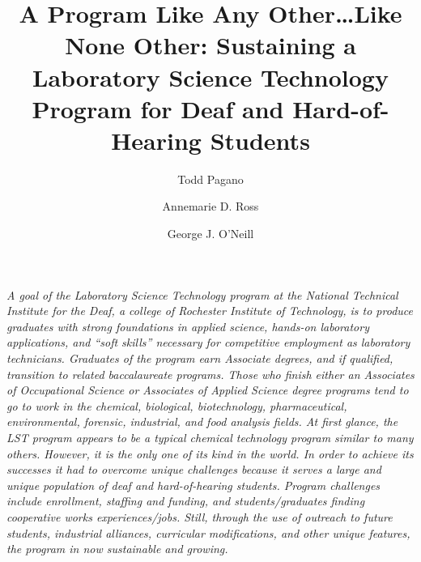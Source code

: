 \documentclass[11.5pt]{sig-alternate} %
\makeatletter
\let\oldabstract\abstract
\let\oldendabstract\endabstract
\renewenvironment{abstract} %
{\renewenvironment{quotation}%
               {\list{}{\addtolength{\leftmargin}{1em} %
                        \listparindent 1.5em%
                        \itemindent    \listparindent%
                        \rightmargin   \leftmargin%
                        \parsep        \z@ \@plus\p@}%
                \item\relax}%
               {\endlist}%
\oldabstract}
{\oldendabstract}
\makeatother
\begin{document}
\title{A Program Like Any Other…Like None Other: Sustaining a Laboratory Science Technology Program for Deaf and Hard-of-Hearing Students}

\author[1]{\large \color{blue} Todd Pagano}
\author[1]{\large \color{blue} Annemarie D. Ross}
\author[2]{\large \color{blue} George J. O'Neill}


\toappear{}

\maketitle
\begin{@twocolumnfalse} 
\begin{abstract}
\item 
\begin{large}
\textit{A goal of the Laboratory Science Technology program at the National Technical Institute for the Deaf, a college of Rochester Institute of Technology, is to produce graduates with strong foundations in applied science, hands-on laboratory applications, and “soft skills” necessary for competitive employment as laboratory technicians. Graduates of the program earn Associate degrees, and if qualified, transition to related baccalaureate programs. Those who finish either an Associates of Occupational Science or Associates of Applied Science degree programs tend to go to work in the chemical, biological, biotechnology, pharmaceutical, environmental, forensic, industrial, and food analysis fields. At first glance, the LST program appears to be a typical chemical technology program similar to many others. However, it is the only one of its kind in the world. In order to achieve its successes it had to overcome unique challenges because it serves a large and unique population of deaf and hard-of-hearing students. Program challenges include enrollment, staffing and funding, and students/graduates finding cooperative works experiences/jobs. Still, through the use of outreach to future students, industrial alliances, curricular modifications, and other unique features, the program in now sustainable and growing.} 

\end{large}     
\end{abstract}
\end{@twocolumnfalse}


\end{document}
